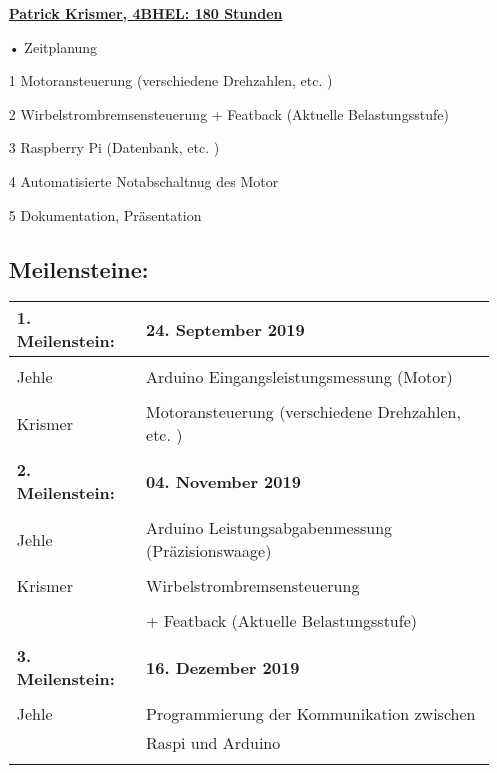 \documentclass[12pt]{article}
\begin{document}
\begin{itemize}
\underline{\textbf{Patrick Krismer, 4BHEL: 180 Stunden }}
\item[•] Zeitplanung
\item[1] Motoransteuerung (verschiedene Drehzahlen, etc. )  
\item[2] Wirbelstrombremsensteuerung + Featback (Aktuelle Belastungsstufe)  
\item[3] Raspberry Pi (Datenbank, etc. ) 
\item[4] Automatisierte Notabschaltnug des Motor 
\item[5] Dokumentation, Präsentation


\subsection*{Meilensteine:} 
\begin{tabular}{| l | l |}
\hline
\textbf{1. Meilenstein: } & \textbf{24. September 2019} \\ \hline & \\
Jehle & Arduino Eingangsleistungsmessung (Motor) \\ & \\

Krismer & Motoransteuerung (verschiedene Drehzahlen, etc. ) \\ & \\ \hline  					%



\textbf{2. Meilenstein: } & \textbf{04. November  2019} \\ \hline & \\
 Jehle &  Arduino Leistungsabgabenmessung (Präzisionswaage) \\ & \\
 
Krismer & Wirbelstrombremsensteuerung \\ & \\ &  + Featback (Aktuelle Belastungsstufe)  \\ & \\ \hline 


\textbf{3. Meilenstein: } & \textbf{16. Dezember 2019} \\ \hline & \\
Jehle & Programmierung der Kommunikation zwischen \\
           & Raspi und Arduino\\ & \\
           

\end{tabular}
\end{itemize}
\end{document}
